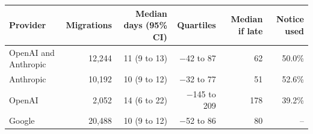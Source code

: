 \begin{tabular}{lrrrrr}
\toprule
Provider & Migrations & Median days (95\% CI) & Quartiles & Median if late & Notice used \\
\midrule
OpenAI and Anthropic & 12,244 & 11 (9 to 13) & $-$42 to 87 & 62 & 50.0\% \\
Anthropic & 10,192 & 10 (9 to 12) & $-$32 to 77 & 51 & 52.6\% \\
OpenAI & 2,052 & 14 (6 to 22) & $-$145 to 209 & 178 & 39.2\% \\
Google & 20,488 & 10 (9 to 12) & $-$52 to 86 & 80 & -- \\
\bottomrule
\end{tabular}
